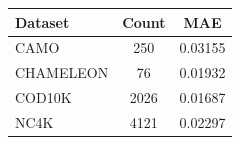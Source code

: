 \begin{tabular}{lcc}
\toprule
Dataset & Count & MAE \\
\midrule
CAMO & 250 & 0.03155 \\
CHAMELEON & 76 & 0.01932 \\
COD10K & 2026 & 0.01687 \\
NC4K & 4121 & 0.02297 \\
\bottomrule
\end{tabular}
